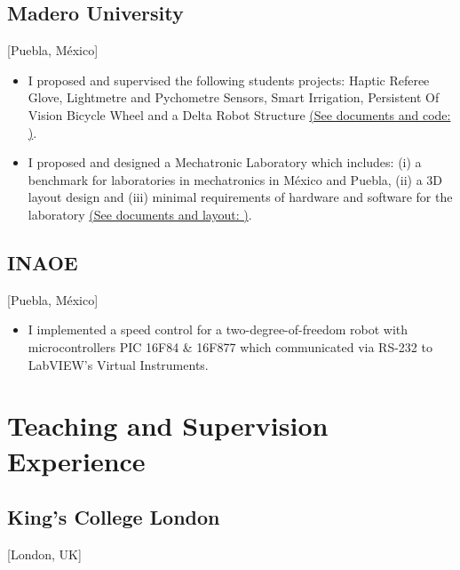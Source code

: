 \documentclass{mycv}
\begin{document}
\subsection{Madero University}[Puebla, M\'exico]
\begin{positions}
\end{positions}
\begin{itemize}
	\item I proposed and supervised the following students projects: Haptic Referee Glove,
	Lightmetre and Pychometre Sensors, Smart Irrigation, Persistent Of Vision Bicycle Wheel
	and a Delta Robot Structure 
	\href{https://sites.google.com/site/perezxochicaleprojects/studentprojects}{(See documents and code: \faExternalLink)}.
	\item I proposed and designed a Mechatronic Laboratory which includes: 
	(i) a benchmark for laboratories in mechatronics in M\'exico and Puebla, 
	(ii) a 3D layout design and 
	(iii) minimal requirements of hardware and software for the laboratory
	\href{https://sites.google.com/site/perezxochicaleprojects/mechatronicslaboratorydesign}{(See documents and layout: \faExternalLink)}.
\end{itemize}

\subsection{INAOE}[Puebla, M\'exico]
\begin{positions}
\end{positions}
\begin{itemize}
  \item  I implemented a speed control for a two-degree-of-freedom robot with microcontrollers
PIC 16F84 \& 16F877 which communicated via RS-232 to LabVIEW's Virtual Instruments.
\end{itemize}

\section{Teaching and Supervision Experience}
\subsection{King's College London}[London, UK]

\begin{positions}
\end{positions}
\end{document}
